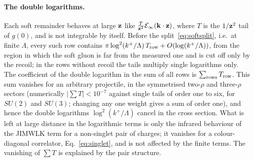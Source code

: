 \paragraph{The double logarithms.} Each soft remainder behaves at large $\mathbf{z}$ like $\frac{T}{\mathbf{z}^2}\mathcal E_\infty(\mathbf{k}\cdot\mathbf{z})$, where $T$ is the $1/\mathbf{z}^2$ tail of $g(0)$, and is not integrable by itself. Before the split~\eqref{eq:softsplit}, i.e.\ at finite $\Lambda$, every such row contains $\pi\log^2(k^+/\Lambda)\,T_{\rm row}+O(\log(k^+/\Lambda))$, from the region in which the soft gluon is far from the measured one and is cut off only by the recoil; in the rows without recoil the tails multiply single logarithms only. The coefficient of the double logarithm in the sum of all rows is $\sum_{\rm rows}T_{\rm row}$. This sum vanishes for an arbitrary projectile, in the symmetrised two-$\rho$ and three-$\rho$ sectors (numerically $|\sum T|<10^{-7}$ against single tails of order one to six, for $SU(2)$ and $SU(3)$; changing any one weight gives a sum of order one), and hence the double logarithms $\log^2(k^+/\Lambda)$ cancel in the cross section. What is left at large distance in the logarithmic terms is only the infrared behaviour of the JIMWLK term for a non-singlet pair of charges; it vanishes for a colour-diagonal correlator, Eq.~\eqref{eq:singlet}, and is not affected by the finite terms. The vanishing of $\sum T$ is explained by the pair structure.

